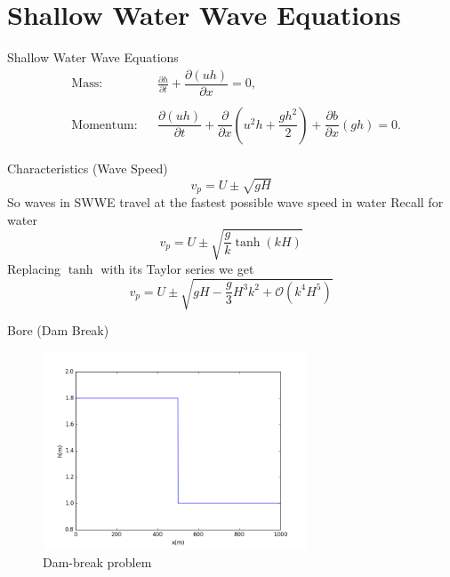 \documentclass[handout]{beamer}
\begin{document}
\section{Shallow Water Wave Equations}
\begin{frame}{Shallow Water Wave Equations}
	\begin{subequations}
		\begin{align*}
		&\text{Mass:} && \frac{\partial h}{\partial t} + \dfrac{\partial (uh)}{\partial x} = 0,  \\ \\
		&\text{Momentum:} &&\dfrac{\partial (uh)}{\partial t} + \dfrac{\partial}{\partial x} \left ( u^2h + \dfrac{gh^2}{2} \right )  +  \dfrac{\partial b}{\partial x} \left (gh   \right ) = 0.
		\end{align*}
	\end{subequations}
\end{frame}
\begin{frame}{Characteristics (Wave Speed)}
		$$ v_p = U \pm \sqrt{gH} $$
		So waves in SWWE travel at the fastest possible wave speed in water
		\pause \newline
		Recall for water
		$$ v_p = U \pm\sqrt{\frac{g}{k} \tanh\left(kH\right)}$$
		\pause
		Replacing $\tanh$ with its Taylor series we get
		$$v_p = U \pm \sqrt{gH - \frac{g}{3} H^3 k^2 +  \mathcal{O}\left(k^4H^5\right)}$$
\end{frame}

\begin{frame}{Bore (Dam Break)}
	\begin{figure}
		\includegraphics[width=0.7\textwidth]{./Figures/DB.png}
		\caption{Dam-break problem}
	\end{figure}
\end{frame}
\end{document}
